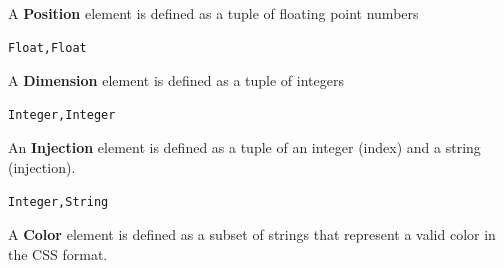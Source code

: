 \documentclass[a4paper]{article}
\begin{document}

A \textbf{Position} element is defined as a tuple of floating point numbers
\begin{lstlisting}[style=boxed]
    Float,Float
\end{lstlisting}

A \textbf{Dimension} element is defined as a tuple of integers
\begin{lstlisting}[style=boxed]
    Integer,Integer
\end{lstlisting}

An \textbf{Injection} element is defined as a tuple of an integer (index) and a string (injection).
\begin{lstlisting}[style=boxed]
    Integer,String
\end{lstlisting}

A \textbf{Color} element is defined as a subset of strings that represent a valid color in the \gls{CSS} format\cite{csscolors}.
\end{document}
